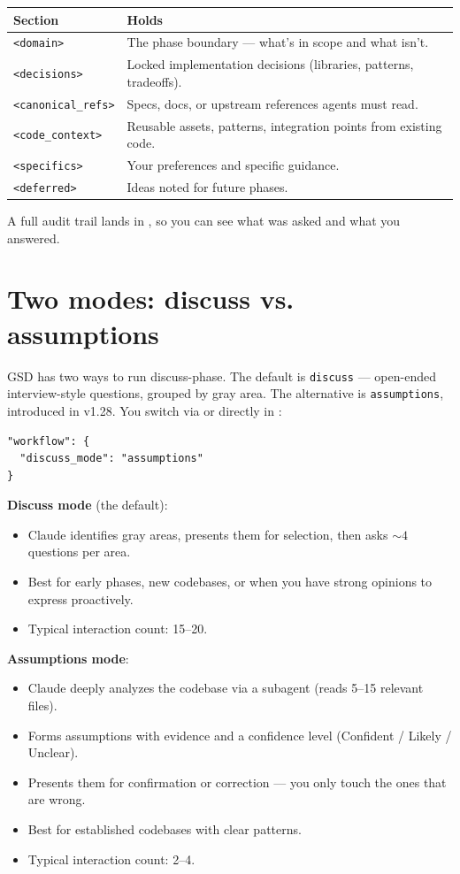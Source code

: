 \documentclass[11pt,letterpaper,openany]{book}
\begin{document}
\begin{tabularx}{\textwidth}{l X}
\toprule
\textbf{Section} & \textbf{Holds} \\
\midrule
\texttt{<domain>} & The phase boundary --- what's in scope and what isn't. \\
\texttt{<decisions>} & Locked implementation decisions (libraries, patterns, tradeoffs). \\
\texttt{<canonical\_refs>} & Specs, docs, or upstream references agents must read. \\
\texttt{<code\_context>} & Reusable assets, patterns, integration points from existing code. \\
\texttt{<specifics>} & Your preferences and specific guidance. \\
\texttt{<deferred>} & Ideas noted for future phases. \\
\bottomrule
\end{tabularx}

A full audit trail lands in , so you can see what was asked and what you answered.

\section{Two modes: discuss vs. assumptions}

GSD has two ways to run discuss-phase. The default is \texttt{discuss} --- open-ended interview-style questions, grouped by gray area. The alternative is \texttt{assumptions}, introduced in v1.28. You switch via  or directly in :

\begin{lstlisting}
"workflow": {
  "discuss_mode": "assumptions"
}
\end{lstlisting}

\textbf{Discuss mode} (the default):
\begin{itemize}[itemsep=2pt]
  \item Claude identifies gray areas, presents them for selection, then asks ${\sim}4$ questions per area.
  \item Best for early phases, new codebases, or when you have strong opinions to express proactively.
  \item Typical interaction count: 15--20.
\end{itemize}

\textbf{Assumptions mode}:
\begin{itemize}[itemsep=2pt]
  \item Claude deeply analyzes the codebase via a subagent (reads 5--15 relevant files).
  \item Forms assumptions with evidence and a confidence level (Confident / Likely / Unclear).
  \item Presents them for confirmation or correction --- you only touch the ones that are wrong.
  \item Best for established codebases with clear patterns.
  \item Typical interaction count: 2--4.
\end{itemize}
\end{document}
